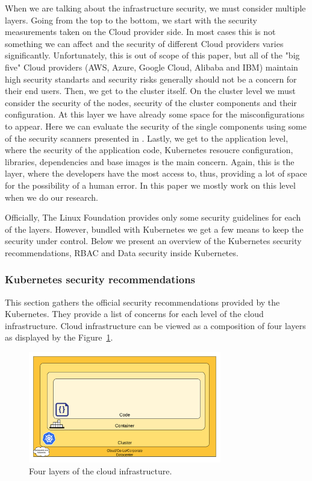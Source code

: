 When we are talking about the infrastructure security, we must consider multiple layers. Going from the top to the bottom, we start with the security measurements taken on the Cloud provider side. In most cases this is not something we can affect and the security of different Cloud providers varies significantly. Unfortunately, this is out of scope of this paper, but all of the "big five" Cloud providers (AWS, Azure, Google Cloud, Alibaba and IBM) maintain high security standarts and security risks generally should not be a concern for their end users. Then, we get to the cluster itself. On the cluster level we must consider the security of the nodes, security of the cluster components and their configuration. At this layer we have already some space for the misconfigurations to appear. Here we can evaluate the security of the single components using some of the security scanners presented in . Lastly, we get to the application level, where the security of the application code, Kubernetes resoucre configuration, libraries, dependencies and base images is the main concern. Again, this is the layer, where the developers have the most access to, thus, providing a lot of space for the possibility of a human error. In this paper we mostly work on this level when we do our research.

Officially, The Linux Foundation provides only some security guidelines for each of the layers. However, bundled with Kubernetes we get a few means to keep the security under control. Below we present an overview of the Kubernetes security recommendations, RBAC and Data security inside Kubernetes.

\subsubsection*{Kubernetes security recommendations}

This section gathers the official security recommendations provided by the Kubernetes. They provide a list of concerns for each level of the cloud infrastructure. Cloud infrastructure can be viewed as a composition of four layers as displayed by the Figure~\ref{img:cloud-security}.

\begin{figure}[!hbt]
	\begin{center}
		\includegraphics[width=0.75\textwidth]{images/cloud-security.png}
        \caption{Four layers of the cloud infrastructure.}
		\label{img:cloud-security}
	\end{center}
\end{figure}


